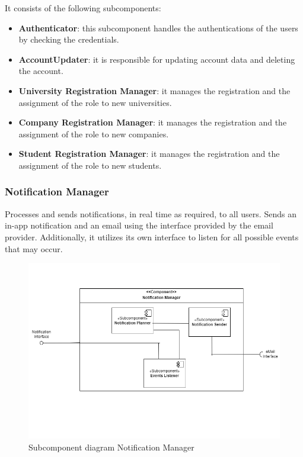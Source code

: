    It consists of the following subcomponents:
   \begin{itemize}
    \item  \textbf{Authenticator}: this subcomponent handles the authentications of the users by checking the credentials.
    \item  \textbf{AccountUpdater}: it is responsible for updating account data and deleting the account.
    \item  \textbf{University Registration Manager}: it manages the registration and the assignment of the role to new universities.
    \item  \textbf{Company Registration Manager}: it manages the registration and the assignment of the role to new companies.
    \item  \textbf{Student Registration Manager}: it manages the registration and the assignment of the role to new students.
    \end{itemize}

\newpage

\subsubsection{Notification Manager}Processes and sends notifications, in real time as required, to all users. Sends an in-app notification and an email using the interface provided by the email provider. Additionally, it utilizes its own interface to listen for all possible events that may occur.
   
\begin{figure}[H]
    \centering
    \includegraphics[width=\linewidth]{DD/Images/Comp&Sub/NotificationManager.png}
    \caption{Subcomponent diagram Notification Manager}
    \label{fig:notification_manager}
\end{figure}
    
